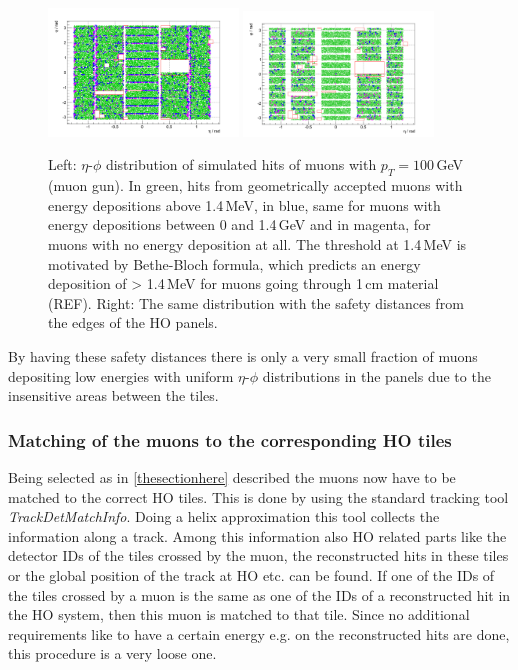 			\begin{figure}[htbp]
				\centering
				\includegraphics[width=0.45\textwidth]{Figures/erdogan/simhits_wo_deta_dphi.png}
				\includegraphics[width=0.45\textwidth]{Figures/erdogan/simhits_with_deta_dphi.png}
				\caption{Left: $\eta$-$\phi$ distribution of simulated hits of muons with $p_T = 100$\,GeV (muon gun). In green, hits from geometrically accepted muons with energy depositions above 1.4\,MeV, in
				blue, same for muons with energy depositions between 0 and 1.4\,GeV and in magenta, for muons with no energy deposition at all. The threshold at 1.4\,MeV is motivated by Bethe-Bloch formula, which
				predicts an energy deposition of > 1.4\,MeV for muons going through 1\,cm material (REF). Right: The same distribution with the safety distances from the edges of the HO panels.}
				\label{fig:simhits_in_acceptance}
			\end{figure}
			By having these safety distances there is only a very small fraction of muons depositing low energies with uniform $\eta$-$\phi$ distributions in the panels due to the insensitive areas between
			the tiles.
		\subsubsection{Matching of the muons to the corresponding HO tiles}
			Being selected as in \ref{thesectionhere} described the muons now have to be matched to the correct HO tiles.
			This is done by using the standard tracking tool \textit{TrackDetMatchInfo}.
			Doing a helix approximation this tool collects the information along a track.
			Among this information also HO related parts like the detector IDs of the tiles crossed by the muon, the reconstructed hits in these tiles or the global position of the track at HO etc. can be
			found.
			If one of the IDs of the tiles crossed by a muon is the same as one of the IDs of a reconstructed hit in the HO system, then this muon is matched to that tile.
			Since no additional requirements like to have a certain energy e.g. on the reconstructed hits are done, this procedure is a very loose one.
